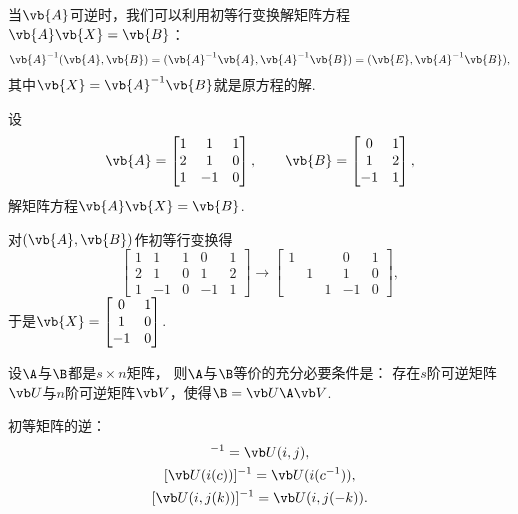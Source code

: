 当\(\vb{A}\)可逆时，我们可以利用初等行变换解矩阵方程\(\vb{A} \vb{X} = \vb{B}\)：\[
	\vb{A}^{-1} (\vb{A},\vb{B})
	= (\vb{A}^{-1} \vb{A},\vb{A}^{-1} \vb{B})
	= (\vb{E},\vb{A}^{-1} \vb{B}),
\]
其中\(\vb{X} = \vb{A}^{-1} \vb{B}\)就是原方程的解.
\begin{example}
设\[
	\vb{A} = \begin{bmatrix}
		1 & 1 & 1 \\
		2 & 1 & 0 \\
		1 & -1 & 0
	\end{bmatrix},
	\qquad
	\vb{B} = \begin{bmatrix}
		0 & 1 \\
		1 & 2 \\
		-1 & 1
	\end{bmatrix},
\]
解矩阵方程\(\vb{A} \vb{X} = \vb{B}\).
\begin{solution}
对\((\vb{A},\vb{B})\)作初等行变换得\[
	\begin{bmatrix}
		1 & 1 & 1 & 0 & 1 \\
		2 & 1 & 0 & 1 & 2 \\
		1 & -1 & 0 & -1 & 1
	\end{bmatrix}
	\to \begin{bmatrix}
		1 & & & 0 & 1 \\
		& 1 & & 1 & 0 \\
		& & 1 & -1 & 0
	\end{bmatrix},
\]
于是\(\vb{X} = \begin{bmatrix}
	0 & 1 \\
	1 & 0 \\
	-1 & 0
\end{bmatrix}\).
\end{solution}
\end{example}

\begin{theorem}
设\(\A\)与\(\B\)都是\(s \times n\)矩阵，
则\(\A\)与\(\B\)等价的充分必要条件是：
存在\(s\)阶可逆矩阵\(\P\)与\(n\)阶可逆矩阵\(\Q\)，使得\(\B=\P\A\Q\).
\end{theorem}

\begin{example}
初等矩阵的逆：\begin{gather*}
	[\P(i,j)]^{-1}=\P(i,j), \\
	[\P(i(c))]^{-1}=\P(i(c^{-1})), \\
	[\P(i,j(k))]^{-1}=\P(i,j(-k)).
\end{gather*}
\end{example}
